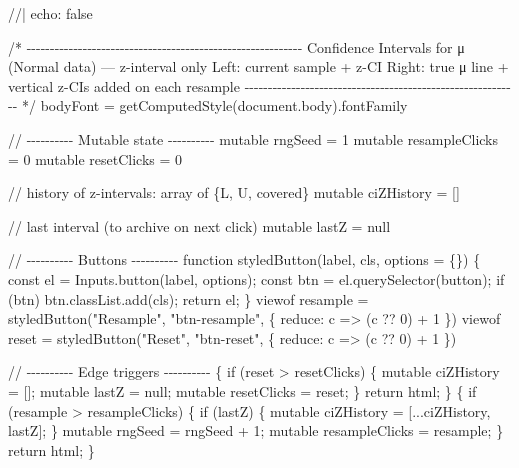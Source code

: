 \documentclass[
  letterpaper,
  DIV=11,
  numbers=noendperiod]{scrreprt}
\newenvironment{Shaded}{\begin{snugshade}}{\end{snugshade}}
\newcommand{\NormalTok}[1]{\textcolor[rgb]{0.00,0.23,0.31}{#1}}
\theoremstyle{definition}
\theoremstyle{plain}
\theoremstyle{definition}
\theoremstyle{remark}
\begin{document}
\begin{Shaded}
\begin{Highlighting}[]
\NormalTok{//| echo: false}

\NormalTok{/* {-}{-}{-}{-}{-}{-}{-}{-}{-}{-}{-}{-}{-}{-}{-}{-}{-}{-}{-}{-}{-}{-}{-}{-}{-}{-}{-}{-}{-}{-}{-}{-}{-}{-}{-}{-}{-}{-}{-}{-}{-}{-}{-}{-}{-}{-}{-}{-}{-}{-}{-}{-}{-}{-}{-}{-}{-}{-}{-}}
\NormalTok{   Confidence Intervals for μ (Normal data) — z{-}interval only}
\NormalTok{   Left: current sample + z{-}CI}
\NormalTok{   Right: true μ line + vertical z{-}CIs added on each resample}
\NormalTok{   {-}{-}{-}{-}{-}{-}{-}{-}{-}{-}{-}{-}{-}{-}{-}{-}{-}{-}{-}{-}{-}{-}{-}{-}{-}{-}{-}{-}{-}{-}{-}{-}{-}{-}{-}{-}{-}{-}{-}{-}{-}{-}{-}{-}{-}{-}{-}{-}{-}{-}{-}{-}{-}{-}{-}{-}{-}{-}{-} */}
\NormalTok{bodyFont = getComputedStyle(document.body).fontFamily}

\NormalTok{// {-}{-}{-}{-}{-}{-}{-}{-}{-}{-} Mutable state {-}{-}{-}{-}{-}{-}{-}{-}{-}{-}}
\NormalTok{mutable rngSeed = 1}
\NormalTok{mutable resampleClicks = 0}
\NormalTok{mutable resetClicks = 0}

\NormalTok{// history of z{-}intervals: array of \{L, U, covered\}}
\NormalTok{mutable ciZHistory = []}

\NormalTok{// last interval (to archive on next click)}
\NormalTok{mutable lastZ = null}


\NormalTok{// {-}{-}{-}{-}{-}{-}{-}{-}{-}{-} Buttons {-}{-}{-}{-}{-}{-}{-}{-}{-}{-}}
\NormalTok{function styledButton(label, cls, options = \{\}) \{}
\NormalTok{  const el = Inputs.button(label, options);}
\NormalTok{  const btn = el.querySelector(\textquotesingle{}button\textquotesingle{});}
\NormalTok{  if (btn) btn.classList.add(cls);}
\NormalTok{  return el;}
\NormalTok{\}}
\NormalTok{viewof resample = styledButton("Resample", "btn{-}resample", \{ reduce: c =\textgreater{} (c ?? 0) + 1 \})}
\NormalTok{viewof reset    = styledButton("Reset",    "btn{-}reset",    \{ reduce: c =\textgreater{} (c ?? 0) + 1 \})}

\NormalTok{// {-}{-}{-}{-}{-}{-}{-}{-}{-}{-} Edge triggers {-}{-}{-}{-}{-}{-}{-}{-}{-}{-}}
\NormalTok{\{}
\NormalTok{  if (reset \textgreater{} resetClicks) \{}
\NormalTok{    mutable ciZHistory = [];}
\NormalTok{    mutable lastZ = null;}
\NormalTok{    mutable resetClicks = reset;}
\NormalTok{  \}}
\NormalTok{  return html\textasciigrave{}\textasciigrave{};}
\NormalTok{\}}
\NormalTok{\{}
\NormalTok{  if (resample \textgreater{} resampleClicks) \{}
\NormalTok{    if (lastZ) \{}
\NormalTok{      mutable ciZHistory = [...ciZHistory, lastZ];}
\NormalTok{    \}}
\NormalTok{    mutable rngSeed = rngSeed + 1;}
\NormalTok{    mutable resampleClicks = resample;}
\NormalTok{  \}}
\NormalTok{  return html\textasciigrave{}\textasciigrave{};}
\NormalTok{\}}


\end{Highlighting}
\end{Shaded}
\end{document}
